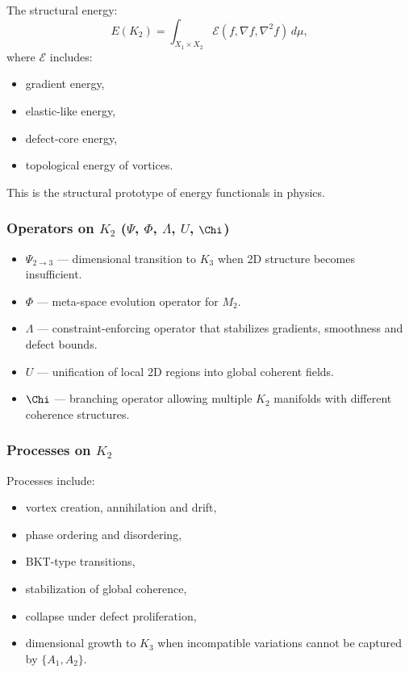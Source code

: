 The structural energy:
\[
E(K_2) = \int_{X_1 \times X_2}
\mathcal{E}(f, \nabla f, \nabla^2 f)\, d\mu,
\]
where $\mathcal{E}$ includes:
\begin{itemize}
    \item gradient energy,
    \item elastic-like energy,
    \item defect-core energy,
    \item topological energy of vortices.
\end{itemize}

This is the structural prototype of energy functionals in physics.

\subsubsection{Operators on \texorpdfstring{$K_2$}{K_2} (\texorpdfstring{$\Psi$}{\Psi}, \texorpdfstring{$\Phi$}{\Phi}, \texorpdfstring{$\Lambda$}{\Lambda}, \texorpdfstring{$U$}{U}, \texorpdfstring{$\Chi$}{\Chi})}

\begin{itemize}
    \item $\Psi_{2\to3}$ — dimensional transition to $K_3$ when 2D
          structure becomes insufficient.
    \item $\Phi$ — meta-space evolution operator for $M_2$.
    \item $\Lambda$ — constraint-enforcing operator that stabilizes
          gradients, smoothness and defect bounds.
    \item $U$ — unification of local 2D regions into global coherent
          fields.
    \item $\Chi$ — branching operator allowing multiple $K_2$
          manifolds with different coherence structures.
\end{itemize}

\subsubsection{Processes on \texorpdfstring{$K_2$}{K_2}}

Processes include:
\begin{itemize}
    \item vortex creation, annihilation and drift,
    \item phase ordering and disordering,
    \item BKT-type transitions,
    \item stabilization of global coherence,
    \item collapse under defect proliferation,
    \item dimensional growth to $K_3$ when incompatible variations
          cannot be captured by $\{A_1, A_2\}$.
\end{itemize}

